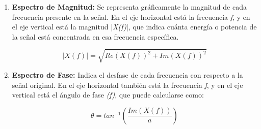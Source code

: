 \documentclass{article}
\begin{document}
\begin{enumerate}
    \item \textbf{Espectro de Magnitud:} Se representa gráficamente la magnitud de cada frecuencia presente en la señal. En el eje horizontal está la frecuencia \textit{f}, y en el eje vertical está la magnitud |\textit{X(f)}|, que indica cuánta energía o potencia de la señal está concentrada en esa frecuencia específica.

    \begin{equation}
        |X(f)| = \sqrt{Re(X(f))^2+Im(X(f))^2}
    \end{equation}
    
    \item \textbf{Espectro de Fase:} Indica el desfase de cada frecuencia con respecto a la señal original. En el eje horizontal también está la frecuencia \textit{f}, y en el eje vertical está el ángulo de fase \textit{\theta(f)}, que puede calcularse como:

    \begin{equation}
        \theta = tan^{-1} \left(\frac{Im(X(f))}{a}\right)
        \label{eq:1}
    \end{equation}
\end{enumerate}
\end{document}
